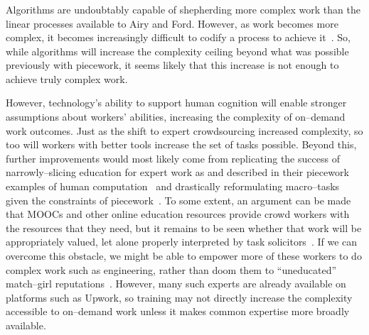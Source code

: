 \documentclass[trackingWork]{subfiles}
\begin{document}

\subsubsection{\implication}
Algorithms are undoubtably capable of shepherding more complex work than the linear processes available to Airy and Ford.
However, as work becomes more complex, it becomes increasingly difficult to codify a process to achieve it~\cite{Faraj2006a,edmondson2012teaming}.
So, while algorithms will increase the complexity ceiling beyond what was possible previously with piecework, it seems likely that this increase is not enough to achieve truly complex work.

However, technology's ability to support human cognition will enable stronger assumptions about workers' abilities, increasing the complexity of on--demand work outcomes.
Just as the shift to expert crowdsourcing increased complexity, so too will workers with better tools increase the set of tasks possible.
Beyond this, further improvements would most likely come from replicating the success of narrowly--slicing education for expert work as \citeauthor{hart2013rise} and \citeauthor{grier2013computers} described in their piecework examples
of human computation~\cite{grier2013computers} and drastically reformulating macro--tasks given the constraints of piecework~\cite{hart2013rise}.
To some extent, an argument can be made that
MOOCs and other online education resources
provide crowd workers with the resources that they need, but 
it remains to be seen whether that work will be appropriately valued, let alone
properly interpreted by task solicitors~\cite{aguaded2013mooc}.
If we can overcome this obstacle,
we might be able to empower more of these workers to do complex work such as engineering,
rather than doom them to ``uneducated'' match--girl reputations~\cite{10.2307/3827491}.
However, many such experts are already available on platforms such as Upwork, so training may not directly increase the complexity accessible to on--demand work unless it makes common expertise more broadly available.
\end{document}
